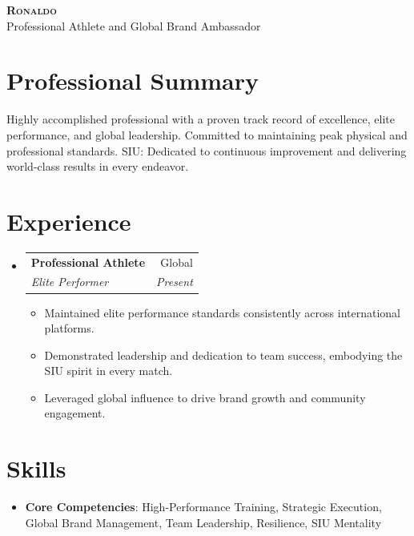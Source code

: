 \documentclass[letterpaper,11pt]{article}
\makeatletter
\newcommand{\resumeItem}[1]{
\item\small{
{#1 \vspace{-2pt}}
}
}
\newcommand{\resumeSubheading}[4]{
\vspace{-2pt}\item
\begin{tabular*}{0.97\textwidth}[t]{l@{\extracolsep{\fill}}r}
\textbf{#1} & #2 \\
\textit{\small#3} & \textit{\small #4} \\
\end{tabular*}\vspace{-7pt}
}
\newcommand{\resumeSubHeadingListStart}{\begin{itemize}[leftmargin=0.15in, label={}]}
\newcommand{\resumeSubHeadingListEnd}{\end{itemize}}
\newcommand{\resumeItemListStart}{\begin{itemize}}
\newcommand{\resumeItemListEnd}{\end{itemize}\vspace{-5pt}}
\makeatother
\begin{document}
\begin{center}
\textbf{\Huge \scshape Ronaldo} \\ \vspace{1pt}
\small Professional Athlete and Global Brand Ambassador
\end{center}

\section{Professional Summary}
Highly accomplished professional with a proven track record of excellence, elite performance, and global leadership. Committed to maintaining peak physical and professional standards. SIU: Dedicated to continuous improvement and delivering world-class results in every endeavor.

\section{Experience}
\resumeSubHeadingListStart
\resumeSubheading{Professional Athlete}{Global}{Elite Performer}{Present}
\resumeItemListStart
\resumeItem{Maintained elite performance standards consistently across international platforms.}
\resumeItem{Demonstrated leadership and dedication to team success, embodying the SIU spirit in every match.}
\resumeItem{Leveraged global influence to drive brand growth and community engagement.}
\resumeItemListEnd
\resumeSubHeadingListEnd

\section{Skills}
\begin{itemize}[leftmargin=0.15in, label={}]
\item{
\textbf{Core Competencies}{: High-Performance Training, Strategic Execution, Global Brand Management, Team Leadership, Resilience, SIU Mentality}
}
\end{itemize}
\end{document}
